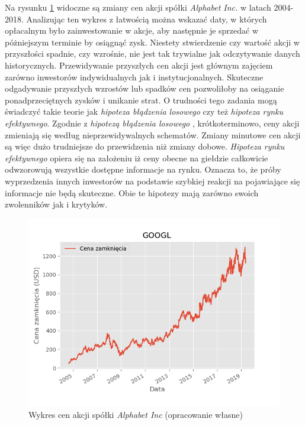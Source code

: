 \documentclass[a4paper, twoside, 11pt, openright]{article}
\begin{document}
Na rysunku \ref{img:alphabet_history} widoczne są zmiany cen akcji spółki \textit{Alphabet Inc.} w latach 2004-2018. Analizując ten wykres z łatwością można wskazać daty, w których opłacalnym było zainwestowanie w akcje, aby następnie je sprzedać w póżniejszym terminie by osiągnąć zysk. Niestety stwierdzenie czy wartość akcji w przyszłości spadnie, czy wzrośnie, nie jest tak trywialne jak odczytywanie danych historycznych. Przewidywanie przyszłych cen akcji jest głównym zajęciem zarówno inwestorów indywidualnych jak i instytucjonalnych. Skuteczne odgadywanie przyszłych wzrostów lub spadków cen pozwoliłoby na osiąganie ponadprzeciętnych zysków i unikanie strat. O trudności tego zadania mogą świadczyć takie teorie jak \textit{hipoteza błądzenia losowego} czy też \textit{hipoteza rynku efektywnego}. Zgodnie z \textit{hipotezą błądzenia losowego} \cite{randwalk}, krótkoterminowo, ceny akcji zmieniają się według nieprzewidywalnych schematów. Zmiany minutowe cen akcji są więc dużo trudniejsze do przewidzenia niż zmiany dobowe. \textit{Hipoteza rynku efektywnego} \cite{efficientmarket} opiera się na założeniu iż ceny obecne na giełdzie całkowicie odwzorowują wszystkie dostępne informacje na rynku. Oznacza to, że próby wyprzedzenia innych inwestorów na podstawie szybkiej reakcji na pojawiające się informacje nie będą skuteczne. Obie te hipotezy mają zarówno swoich zwolenników jak i krytyków.

\begin{figure}[H]
\centering \includegraphics[scale=0.9]{img/GOOGL_adj_close.png}
\caption{Wykres cen akcji spółki \textit{Alphabet Inc} (opracowanie własne)}
\label{img:alphabet_history}
\end{figure}
\end{document}
